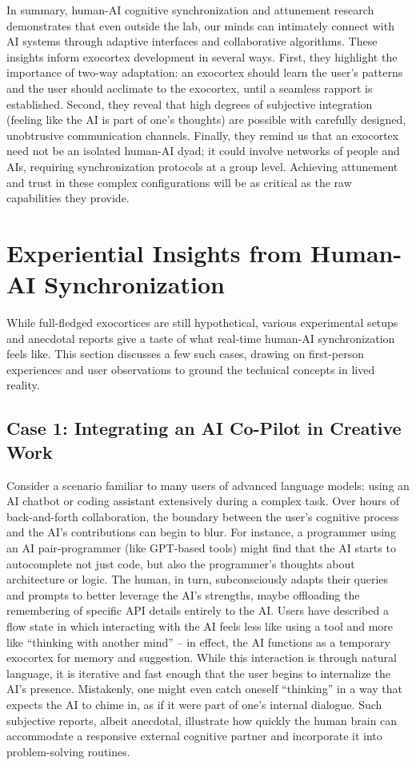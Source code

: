\documentclass[11pt]{article}
\newcommand{\quotes}[1]{``#1''}
\begin{document}
In summary, human-AI cognitive synchronization and attunement research demonstrates that even outside the lab, our minds can intimately connect with AI systems through adaptive interfaces and collaborative algorithms. These insights inform exocortex development in several ways. First, they highlight the importance of two-way adaptation: an exocortex should learn the user's patterns and the user should acclimate to the exocortex, until a seamless rapport is established. Second, they reveal that high degrees of subjective integration (feeling like the AI is part of one's thoughts) are possible with carefully designed, unobtrusive communication channels. Finally, they remind us that an exocortex need not be an isolated human-AI dyad; it could involve networks of people and AIs, requiring synchronization protocols at a group level. Achieving attunement and trust in these complex configurations will be as critical as the raw capabilities they provide.

\section{Experiential Insights from Human-AI Synchronization}
While full-fledged exocortices are still hypothetical, various experimental setups and anecdotal reports give a taste of what real-time human-AI synchronization feels like. This section discusses a few such cases, drawing on first-person experiences and user observations to ground the technical concepts in lived reality.

\subsection*{Case 1: Integrating an AI Co-Pilot in Creative Work}
Consider a scenario familiar to many users of advanced language models: using an AI chatbot or coding assistant extensively during a complex task. Over hours of back-and-forth collaboration, the boundary between the user's cognitive process and the AI's contributions can begin to blur. For instance, a programmer using an AI pair-programmer (like GPT-based tools) might find that the AI starts to autocomplete not just code, but also the programmer's thoughts about architecture or logic. The human, in turn, subconsciously adapts their queries and prompts to better leverage the AI's strengths, maybe offloading the remembering of specific API details entirely to the AI. Users have described a flow state in which interacting with the AI feels less like using a tool and more like \quotes{thinking with another mind} -- in effect, the AI functions as a temporary exocortex for memory and suggestion. While this interaction is through natural language, it is iterative and fast enough that the user begins to internalize the AI's presence. Mistakenly, one might even catch oneself \quotes{thinking} in a way that expects the AI to chime in, as if it were part of one's internal dialogue. Such subjective reports, albeit anecdotal, illustrate how quickly the human brain can accommodate a responsive external cognitive partner and incorporate it into problem-solving routines.
\end{document}
